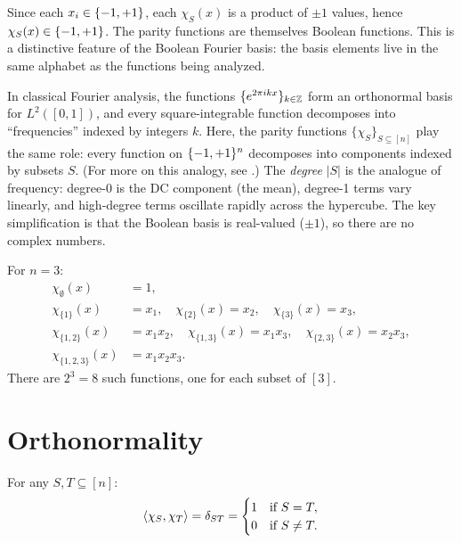 Since each $x_i \in \{-1,+1\}$, each $\chi_S(x)$ is a product of $\pm 1$
values, hence $\chi_S(x) \in \{-1,+1\}$. The parity functions are themselves
Boolean functions. This is a distinctive feature of the Boolean Fourier
basis: the basis elements live in the same alphabet as the functions
being analyzed.

\begin{remark}\label{rem:fourier-analogy}
In classical Fourier analysis, the functions $\{e^{2\pi i k x}\}_{k \in \mathbb{Z}}$
form an orthonormal basis for $L^2([0,1])$, and every square-integrable
function decomposes into ``frequencies'' indexed by integers $k$. Here,
the parity functions $\{\chi_S\}_{S \subseteq [n]}$ play the same role:
every function on $\{-1,+1\}^n$ decomposes into components indexed by subsets
$S$. (For more on this analogy, see \citealp[\S1.1]{odonnell2014analysis}.) The \emph{degree} $|S|$ is the analogue of frequency: degree-0 is
the DC component (the mean), degree-1 terms vary linearly, and high-degree
terms oscillate rapidly across the hypercube. The key simplification is
that the Boolean basis is real-valued ($\pm 1$), so there are no complex
numbers.
\end{remark}

\begin{example}\label{ex:parity-functions}
For $n = 3$:
\begin{align*}
  \chi_\emptyset(x) &= 1, \\
  \chi_{\{1\}}(x) &= x_1, \quad
  \chi_{\{2\}}(x) = x_2, \quad
  \chi_{\{3\}}(x) = x_3, \\
  \chi_{\{1,2\}}(x) &= x_1 x_2, \quad
  \chi_{\{1,3\}}(x) = x_1 x_3, \quad
  \chi_{\{2,3\}}(x) = x_2 x_3, \\
  \chi_{\{1,2,3\}}(x) &= x_1 x_2 x_3.
\end{align*}
There are $2^3 = 8$ such functions, one for each subset of $[3]$.
\end{example}


\section{Orthonormality}\label{sec:orthonormality}

\begin{theorem}\label{thm:orthonormality}
For any $S, T \subseteq [n]$:
\begin{equation}\label{eq:orthonormality}
  \langle \chi_S, \chi_T \rangle = \delta_{ST} =
  \begin{cases}
    1 & \text{if } S = T, \\
    0 & \text{if } S \neq T.
  \end{cases}
\end{equation}
\end{theorem}

